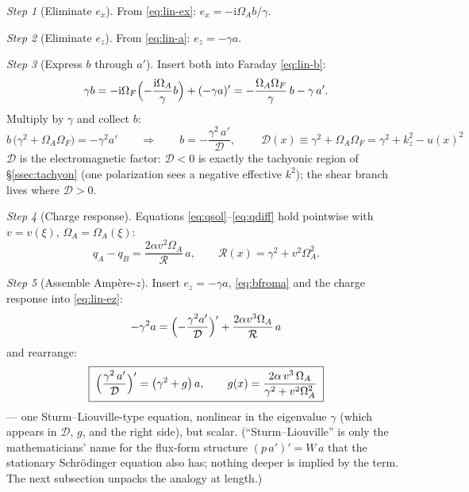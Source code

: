 \documentclass[11pt,a4paper]{article}
\numberwithin{equation}{section}
\theoremstyle{remark}
\newtheorem{step}{Step}[subsection]
\newcommand{\kz}{k_z}
\newcommand{\OmA}{\Omega_A}
\newcommand{\OmF}{\Omega_F}
\newcommand{\D}{\mathcal{D}}
\newcommand{\R}{\mathcal{R}}
\newcommand{\ii}{\mathrm{i}}
\begin{document}
\begin{step}[Eliminate $e_x$]
From \eqref{eq:lin-ex}: $e_x=-\ii\OmA b/\gamma$.
\end{step}

\begin{step}[Eliminate $e_z$]
From \eqref{eq:lin-a}: $e_z=-\gamma a$.
\end{step}

\begin{step}[Express $b$ through $a'$]
Insert both into Faraday \eqref{eq:lin-b}:
\begin{equation}
\gamma b=-\ii\OmF\Bigl(-\frac{\ii\OmA}{\gamma}b\Bigr)+(-\gamma a)'
=-\frac{\OmA\OmF}{\gamma}\,b-\gamma\,a' .
\end{equation}
Multiply by $\gamma$ and collect $b$:
\begin{equation}
b\,\bigl(\gamma^2+\OmA\OmF\bigr)=-\gamma^2a'
\qquad\Longrightarrow\qquad
b=-\frac{\gamma^2\,a'}{\D},
\qquad
\boxed{\;\D(x)\equiv\gamma^2+\OmA\OmF=\gamma^2+\kz^2-u(x)^2\;}
\label{eq:bfroma}
\end{equation}
$\D$ is the electromagnetic factor: $\D<0$ is exactly the tachyonic region
of \S\ref{ssec:tachyon} (one polarization sees a negative effective
$k^2$); the shear branch lives where $\D>0$.
\end{step}

\begin{step}[Charge response]
Equations \eqref{eq:qsol}--\eqref{eq:qdiff} hold pointwise with
$v=v(\xi)$, $\OmA=\OmA(\xi)$:
\begin{equation}
q_A-q_B=\frac{2\alpha v^2\OmA}{\R}\,a,
\qquad \R(x)=\gamma^2+v^2\OmA^2 .
\end{equation}
\end{step}

\begin{step}[Assemble Amp\`ere-$z$]
Insert $e_z=-\gamma a$, \eqref{eq:bfroma} and the charge response into
\eqref{eq:lin-ez}:
\begin{equation}
-\gamma^2a
=\Bigl(-\frac{\gamma^2a'}{\D}\Bigr)'+\frac{2\alpha v^3\OmA}{\R}\,a
\end{equation}
and rearrange:
\begin{equation}
\boxed{\;
\Bigl(\frac{\gamma^2\,a'}{\D}\Bigr)'=\bigl(\gamma^2+g\bigr)\,a,
\qquad
g(x)=\frac{2\alpha\,v^3\,\OmA}{\gamma^2+v^2\OmA^2}\;}
\label{eq:reduced}
\end{equation}
--- one Sturm--Liouville-type equation, nonlinear in the eigenvalue
$\gamma$ (which appears in $\D$, $g$, and the right side), but scalar.
(``Sturm--Liouville'' is only the mathematicians' name for the flux-form
structure $(p\,a')'=W\,a$ that the stationary Schr\"odinger equation
also has; nothing deeper is implied by the term. The next subsection
unpacks the analogy at length.)
\end{step}
\end{document}
